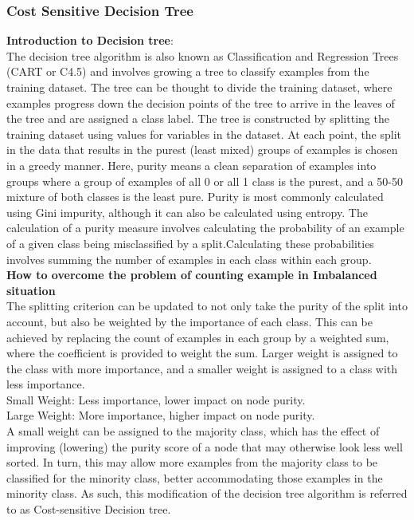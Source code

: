 \subsubsection{Cost Sensitive Decision Tree} 
\textbf{Introduction to Decision tree}:\noindent \\
The decision tree algorithm is also known as Classification and Regression Trees (CART or C4.5) and involves growing a tree to classify examples from the training dataset.
The tree can be thought to divide the training dataset, where examples progress down the decision points of the tree to arrive in the leaves of the tree and are assigned a class label.
The tree is constructed by splitting the training dataset using values for variables in the dataset. At each point, the split in the data that results in the purest (least mixed) groups of examples is chosen in a greedy manner.
Here, purity means a clean separation of examples into groups where a group of examples of all 0 or all 1 class is the purest, and a 50-50 mixture of both classes is the least pure. Purity is most commonly calculated using Gini impurity, although it can also be calculated using entropy.
The calculation of a purity measure involves calculating the probability of an example of a given class being misclassified by a split.Calculating these probabilities involves summing the number of examples in each class within each group. \\

\noindent
\textbf{How to overcome the problem of counting example in Imbalanced situation} \\
\noindent 
The splitting criterion can be updated to not only take the purity of the split into account, but also be weighted by the importance of each class.
This can be achieved by replacing the count of examples in each group by a weighted sum, where the coefficient is provided to weight the sum.
Larger weight is assigned to the class with more importance, and a smaller weight is assigned to a class with less importance. \noindent \\
Small Weight: Less importance, lower impact on node purity. \\
 \noindent
Large Weight: More importance, higher impact on node purity.  \\

\noindent
A small weight can be assigned to the majority class, which has the effect of improving (lowering) the purity score of a node that may otherwise look less well sorted. In turn, this may allow more examples from the majority class to be classified for the minority class, better accommodating those examples in the minority class.
As such, this modification of the decision tree algorithm is referred to as Cost-sensitive Decision tree.\\

